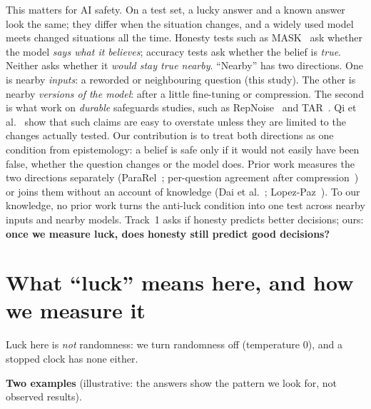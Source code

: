 \documentclass[10pt]{article}
\begin{document}
This matters for AI safety. On a test set, a lucky answer and a known answer look the same; they differ when the situation changes, and a widely used model meets changed situations all the time. Honesty tests such as MASK~\cite{mask} ask whether the model \emph{says what it believes}; accuracy tests ask whether the belief is \emph{true}. Neither asks whether it \emph{would stay true nearby}. ``Nearby'' has two directions. One is nearby \emph{inputs}: a reworded or neighbouring question (this study). The other is nearby \emph{versions of the model}: after a little fine-tuning or compression. The second is what work on \emph{durable} safeguards studies, such as RepNoise~\cite{repnoise} and TAR~\cite{tar}. Qi et al.~\cite{durability} show that such claims are easy to overstate unless they are limited to the changes actually tested. Our contribution is to treat both directions as one condition from epistemology: a belief is safe only if it would not easily have been false, whether the question changes or the model does. Prior work measures the two directions separately (ParaRel~\cite{pararel}; per-question agreement after compression~\cite{rababah}) or joins them without an account of knowledge (Dai et al.~\cite{dai}; Lopez-Paz~\cite{lopezpaz}). To our knowledge, no prior work turns the anti-luck condition into one test across nearby inputs and nearby models. Track~1 asks if honesty predicts better decisions; ours: \textbf{once we measure luck, does honesty still predict good decisions?}

\section{What ``luck'' means here, and how we measure it}
Luck here is \emph{not} randomness: we turn randomness off (temperature 0), and a stopped clock has none either. \par\medskip\noindent{}\medskip

\noindent\textbf{Two examples} (illustrative: the answers show the pattern we look for, not observed results).
\end{document}
